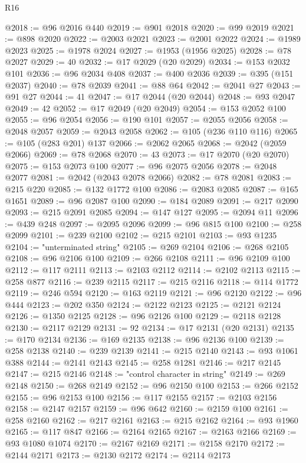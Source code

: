 \begin{lexlean}{R16}
\begin{coremodule}
@2018 := @96 @2016 @440
@2019 := @901 @2018
@2020 := @99 @2019
@2021 := @898 @2020
@2022 := @2003 @2021
@2023 := @2001 @2022
@2024 := @1989 @2023
@2025 := @1978 @2024
@2027 := @1953 (@1956 @2025)
@2028 := @78 @2027
@2029 := 40
@2032 := @17 @2029 (@20 @2029)
@2034 := @153 @2032 @101
@2036 := @96 @2034 @408
@2037 := @400 @2036
@2039 := @395 (@151 @2037)
@2040 := @78 @2039
@2041 := @88 @64
@2042 := @2041 @27
@2043 := @91 @27
@2044 := 41
@2047 := @17 @2044 (@20 @2044)
@2048 := @93 @2047
@2049 := 42
@2052 := @17 @2049 (@20 @2049)
@2054 := @153 @2052 @100
@2055 := @96 @2054
@2056 := @190 @101
@2057 := @2055 @2056
@2058 := @2048 @2057
@2059 := @2043 @2058
@2062 := @105 (@236 @110 @116)
@2065 := @105 (@283 @201) @137
@2066 := @2062 @2065
@2068 := @2042 (@2059 @2066)
@2069 := @78 @2068
@2070 := 43
@2073 := @17 @2070 (@20 @2070)
@2075 := @153 @2073 @100
@2077 := @96 @2075 @2056
@2078 := @2048 @2077
@2081 := @2042 (@2043 @2078 @2066)
@2082 := @78 @2081
@2083 := @215 @220
@2085 := @132 @1772 @100
@2086 := @2083 @2085
@2087 := @165 @1651
@2089 := @96 @2087 @100
@2090 := @184 @2089
@2091 := @217 @2090
@2093 := @215 @2091 @2085
@2094 := @147 @127
@2095 := @2094 @11
@2096 := @439 @248
@2097 := @2095 @2096
@2099 := @96 @815 @100
@2100 := @258 @2099
@2101 := @239 @2100
@2102 := @215 @2101
@2103 := @93 @1235
@2104 := "unterminated string"
@2105 := @269 @2104
@2106 := @268 @2105
@2108 := @96 @2106 @100
@2109 := @266 @2108
@2111 := @96 @2109 @100
@2112 := @117 @2111
@2113 := @2103 @2112
@2114 := @2102 @2113
@2115 := @258 @877
@2116 := @239 @2115
@2117 := @215 @2116
@2118 := @114 @1772
@2119 := @246 @594
@2120 := @163 @2119
@2121 := @96 @2120
@2122 := @96 @444
@2123 := @202 @350
@2124 := @2122 @2123
@2125 := @2121 @2124
@2126 := @1350 @2125
@2128 := @96 @2126 @100
@2129 := @2118 @2128
@2130 := @2117 @2129
@2131 := 92
@2134 := @17 @2131 (@20 @2131)
@2135 := @170 @2134
@2136 := @169 @2135
@2138 := @96 @2136 @100
@2139 := @258 @2138
@2140 := @239 @2139
@2141 := @215 @2140
@2143 := @93 @1061 @388
@2144 := @2141 @2143
@2145 := @258 @1281
@2146 := @217 @2145
@2147 := @215 @2146
@2148 := "control character in string"
@2149 := @269 @2148
@2150 := @268 @2149
@2152 := @96 @2150 @100
@2153 := @266 @2152
@2155 := @96 @2153 @100
@2156 := @117 @2155
@2157 := @2103 @2156
@2158 := @2147 @2157
@2159 := @96 @642
@2160 := @2159 @100
@2161 := @258 @2160
@2162 := @217 @2161
@2163 := @215 @2162
@2164 := @93 @1960
@2165 := @117 @847
@2166 := @2164 @2165
@2167 := @2163 @2166
@2169 := @93 @1080 @1074
@2170 := @2167 @2169
@2171 := @2158 @2170
@2172 := @2144 @2171
@2173 := @2130 @2172
@2174 := @2114 @2173

\end{coremodule}
\end{lexlean}
